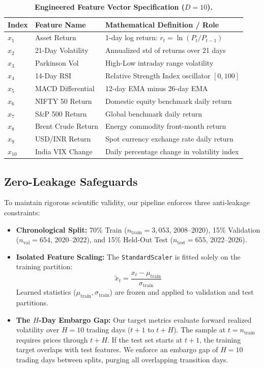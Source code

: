 \documentclass[10pt,twocolumn,letterpaper]{article}
\begin{document}
\begin{table}[t]
\centering
\small
\caption{\textbf{Engineered Feature Vector Specification ($D=10$).}}
\label{tab:features}
\begin{tabularx}{\columnwidth}{llX}
\toprule
\textbf{Index} & \textbf{Feature Name} & \textbf{Mathematical Definition / Role} \\
\midrule
$x_1$ & Asset Return & 1-day log return: $r_t = \ln(P_t / P_{t-1})$ \\
$x_2$ & 21-Day Volatility & Annualized std of returns over 21 days \\
$x_3$ & Parkinson Vol & High-Low intraday range volatility \\
$x_4$ & 14-Day RSI & Relative Strength Index oscillator $[0, 100]$ \\
$x_5$ & MACD Differential & 12-day EMA minus 26-day EMA \\
$x_6$ & NIFTY 50 Return & Domestic equity benchmark daily return \\
$x_7$ & S\&P 500 Return & Global benchmark daily return \\
$x_8$ & Brent Crude Return & Energy commodity front-month return \\
$x_9$ & USD/INR Return & Spot currency exchange rate daily return \\
$x_{10}$ & India VIX Change & Daily percentage change in volatility index \\
\bottomrule
\end{tabularx}
\end{table}

\subsection{Zero-Leakage Safeguards}
To maintain rigorous scientific validity, our pipeline enforces three anti-leakage constraints:
\begin{itemize}[leftmargin=*]
    \item \textbf{Chronological Split:} 70\% Train ($n_{\text{train}} = 3,053$, 2008--2020), 15\% Validation ($n_{\text{val}} = 654$, 2020--2022), and 15\% Held-Out Test ($n_{\text{test}} = 655$, 2022--2026).
    \item \textbf{Isolated Feature Scaling:} The \texttt{StandardScaler} is fitted solely on the training partition:
    \begin{equation}
        \tilde{x}_t = \frac{x_t - \mu_{\text{train}}}{\sigma_{\text{train}}}
    \end{equation}
    Learned statistics ($\mu_{\text{train}}, \sigma_{\text{train}}$) are frozen and applied to validation and test partitions.
    \item \textbf{The $H$-Day Embargo Gap:} Our target metrics evaluate forward realized volatility over $H = 10$ trading days ($t+1$ to $t+H$). The sample at $t = n_{\text{train}}$ requires prices through $t+H$. If the test set starts at $t+1$, the training target overlaps with test features. We enforce an embargo gap of $H = 10$ trading days between splits, purging all overlapping transition days.
\end{itemize}
\end{document}
